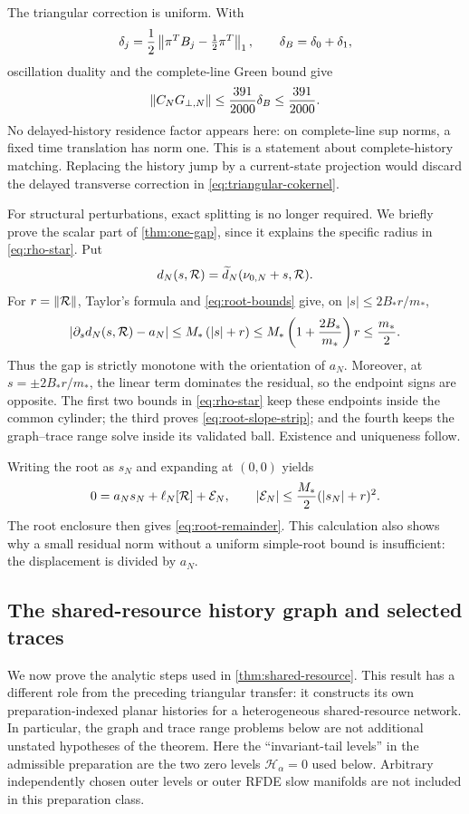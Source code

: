 The triangular correction is uniform.  With
\[
 \delta_j=\frac12\left\lVert\pi^TB_j-\tfrac12\pi^T\right\rVert_1,
 \qquad \delta_B=\delta_0+\delta_1,
\]
oscillation duality and the complete-line Green bound give
\begin{equation}
 \left\lVert C_NG_{\perp,N}\right\rVert
 \le\frac{391}{2000}\delta_B\le\frac{391}{2000}.       \label{eq:triangular-row-bound}
\end{equation}
No delayed-history residence factor appears here: on complete-line sup
norms, a fixed time translation has norm one.  This is a statement about
complete-history matching.  Replacing the history jump by a current-state
projection would discard the delayed transverse correction in
\cref{eq:triangular-cokernel}.

For structural perturbations, exact splitting is no longer required.  We
briefly prove the scalar part of \cref{thm:one-gap}, since it explains the
specific radius in \cref{eq:rho-star}.  Put
\[
 d_N(s,\mathcal R)=\widetilde d_N(\nu_{0,N}+s,\mathcal R).
\]
For \(r=\left\lVert\mathcal R\right\rVert\), Taylor's formula and
\cref{eq:root-bounds} give, on
\(|s|\le2B_*r/m_*\),
\begin{equation}
 \left\lvert\partial_sd_N(s,\mathcal R)-a_N\right\rvert
 \le M_*\left(\left\lvert s\right\rvert+r\right)
 \le M_*\left(1+\frac{2B_*}{m_*}\right)r
 \le\frac{m_*}{2}.                                    \label{eq:root-slope-strip}
\end{equation}
Thus the gap is strictly monotone with the orientation of \(a_N\).
Moreover, at \(s=\pm2B_*r/m_*\), the linear term dominates the residual,
so the endpoint signs are opposite.  The first two bounds in
\cref{eq:rho-star} keep these endpoints inside the common cylinder; the
third proves \cref{eq:root-slope-strip}; and the fourth keeps the
graph--trace range solve inside its validated ball.  Existence and
uniqueness follow.

Writing the root as \(s_N\) and expanding at \((0,0)\) yields
\[
 0=a_Ns_N+\ell_N[\mathcal R]+\mathcal E_N,\qquad
 \left\lvert\mathcal E_N\right\rvert\le\frac{M_*}{2}(\left\lvert s_N\right\rvert+r)^2.
\]
The root enclosure then gives \cref{eq:root-remainder}.  This calculation
also shows why a small residual norm without a uniform simple-root bound is
insufficient: the displacement is divided by \(a_N\).

\subsection{The shared-resource history graph and selected traces}
\label{subsec:shared-proof}

We now prove the analytic steps used in \cref{thm:shared-resource}.  This
result has a different role from the preceding triangular transfer: it
constructs its own preparation-indexed planar histories for a heterogeneous
shared-resource network.  In particular, the graph and trace range problems
below are not additional unstated hypotheses of the theorem.
Here the ``invariant-tail levels'' in the admissible preparation are the two
zero levels \(\mathscr H_\alpha=0\) used below.  Arbitrary independently
chosen outer levels or outer RFDE slow manifolds are not included in this
preparation class.

